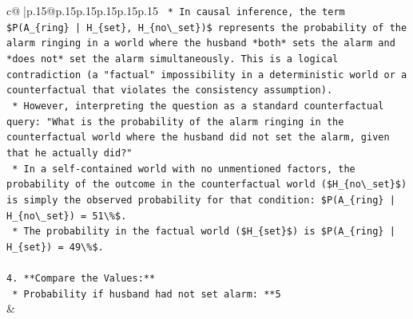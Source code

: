 \documentclass{article}
\begin{document}
{\begin{supertabular}{c@{$\;$}|p{.15\linewidth}@{}p{.15\linewidth}p{.15\linewidth}p{.15\linewidth}p{.15\linewidth}p{.15\linewidth}}
{{{\texttt{    *   In causal inference, the term \$P(A\_\{ring\} | H\_\{set\}, H\_\{no\textbackslash{}\_set\})\$ represents the probability of the alarm ringing in a world where the husband *both* sets the alarm and *does not* set the alarm simultaneously. This is a logical contradiction (a "factual" impossibility in a deterministic world or a counterfactual that violates the consistency assumption).} \\
\texttt{    *   However, interpreting the question as a standard counterfactual query: "What is the probability of the alarm ringing in the counterfactual world where the husband did not set the alarm, given that he actually did?"} \\
\texttt{    *   In a self{-}contained world with no unmentioned factors, the probability of the outcome in the counterfactual world (\$H\_\{no\textbackslash{}\_set\}\$) is simply the observed probability for that condition: \$P(A\_\{ring\} | H\_\{no\textbackslash{}\_set\}) = 51\textbackslash{}\%\$.} \\
\texttt{    *   The probability in the factual world (\$H\_\{set\}\$) is \$P(A\_\{ring\} | H\_\{set\}) = 49\textbackslash{}\%\$.} \\
\\ 
\texttt{4.  **Compare the Values:**} \\
\texttt{    *   Probability if husband had not set alarm: **5} \\
            }
        }
    }
    & \\ \\


\end{supertabular}}
\end{document}
